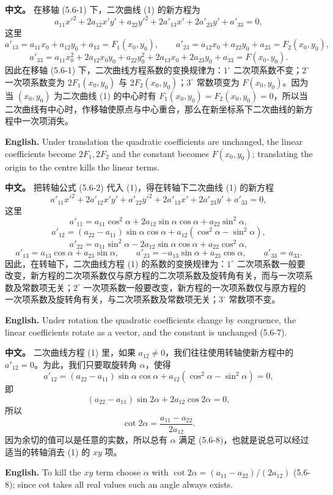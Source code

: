 \documentclass[UTF8,11pt,a4paper]{ctexart}
\newcommand{\APS}[2]{\par\noindent\textbf{中文。} #1\par\noindent\textbf{English.} #2\par\smallskip}
\theoremstyle{definition}
\begin{document}
\APS{在移轴 (5.6-1) 下，二次曲线 (1) 的新方程为
\[
a_{11}x'^2+2a_{12}x'y'+a_{22}y'^2+2a'_{13}x'+2a'_{23}y'+a'_{33}=0,
\]
这里
\[
a'_{13}=a_{11}x_0+a_{12}y_0+a_{13}=F_1(x_0,y_0),\qquad a'_{23}=a_{12}x_0+a_{22}y_0+a_{23}=F_2(x_0,y_0),
\]
\[
a'_{33}=a_{11}x_0^2+2a_{12}x_0y_0+a_{22}y_0^2+2a_{13}x_0+2a_{23}y_0+a_{33}=F(x_0,y_0).\tag{5.6-6}
\]
因此在移轴 (5.6-1) 下，二次曲线方程系数的变换规律为：$1^\circ$ 二次项系数不变；$2^\circ$ 一次项系数变为 $2F_1(x_0,y_0)$ 与 $2F_2(x_0,y_0)$；$3^\circ$ 常数项变为 $F(x_0,y_0)$。因为当 $(x_0,y_0)$ 为二次曲线 (1) 的中心时有 $F_1(x_0,y_0)=F_2(x_0,y_0)=0$，所以当二次曲线有中心时，作移轴使原点与中心重合，那么在新坐标系下二次曲线的新方程中一次项消失。}{Under translation the quadratic coefficients are unchanged, the linear coefficients become $2F_1,2F_2$ and the constant becomes $F(x_0,y_0)$; translating the origin to the centre kills the linear terms.}

\APS{把转轴公式 (5.6-2) 代入 (1)，得在转轴下二次曲线 (1) 的新方程
\[
a'_{11}x'^2+2a'_{12}x'y'+a'_{22}y'^2+2a'_{13}x'+2a'_{23}y'+a'_{33}=0,
\]
这里
\[
a'_{11}=a_{11}\cos^2\alpha+2a_{12}\sin\alpha\cos\alpha+a_{22}\sin^2\alpha,
\]
\[
a'_{12}=(a_{22}-a_{11})\sin\alpha\cos\alpha+a_{12}(\cos^2\alpha-\sin^2\alpha),
\]
\[
a'_{22}=a_{11}\sin^2\alpha-2a_{12}\sin\alpha\cos\alpha+a_{22}\cos^2\alpha,
\]
\[
a'_{13}=a_{13}\cos\alpha+a_{23}\sin\alpha,\qquad a'_{23}=-a_{13}\sin\alpha+a_{23}\cos\alpha,\qquad a'_{33}=a_{33}.\tag{5.6-7}
\]
因此，在转轴下，二次曲线方程 (1) 的系数的变换规律为：$1^\circ$ 二次项系数一般要改变，新方程的二次项系数仅与原方程的二次项系数及旋转角有关，而与一次项系数及常数项无关；$2^\circ$ 一次项系数一般要改变，新方程的一次项系数仅与原方程的一次项系数及旋转角有关，与二次项系数及常数项无关；$3^\circ$ 常数项不变。}{Under rotation the quadratic coefficients change by congruence, the linear coefficients rotate as a vector, and the constant is unchanged (5.6-7).}

\APS{二次曲线方程 (1) 里，如果 $a_{12}\ne0$，我们往往使用转轴使新方程中的 $a'_{12}=0$。为此，我们只要取旋转角 $\alpha$，使得
\[
a'_{12}=(a_{22}-a_{11})\sin\alpha\cos\alpha+a_{12}(\cos^2\alpha-\sin^2\alpha)=0,
\]
即
\[
(a_{22}-a_{11})\sin2\alpha+2a_{12}\cos2\alpha=0,
\]
所以
\[
\cot2\alpha=\frac{a_{11}-a_{22}}{2a_{12}}.\tag{5.6-8}
\]
因为余切的值可以是任意的实数，所以总有 $\alpha$ 满足 (5.6-8)，也就是说总可以经过适当的转轴消去 (1) 的 $xy$ 项。}{To kill the $xy$ term choose $\alpha$ with $\cot2\alpha=(a_{11}-a_{22})/(2a_{12})$ (5.6-8); since cot takes all real values such an angle always exists.}
\end{document}
